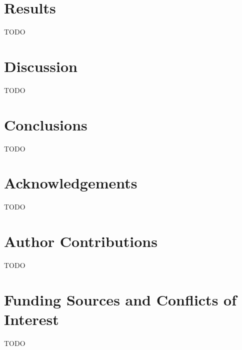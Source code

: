 \documentclass[sigconf]{acmart}
\begin{document}
\section{Results}

TODO

\section{Discussion}



TODO

\section{Conclusions}
TODO

\section{Acknowledgements}
TODO

\section{Author Contributions}
TODO

\section{Funding Sources and Conflicts of Interest}
TODO



\end{document}
